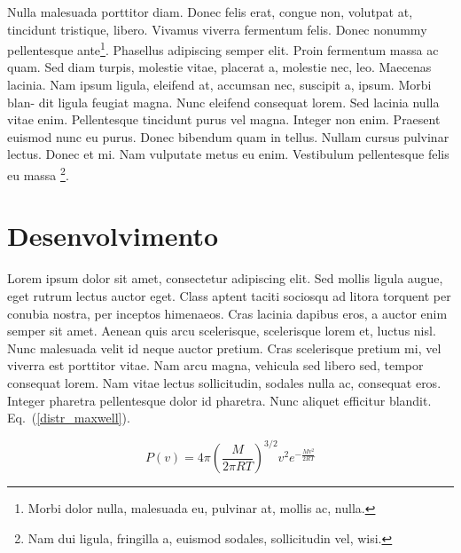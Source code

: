 \documentclass[%
a4paper, %
twocolumn, %
10pt %
]{article}
\begin{document}
Nulla malesuada porttitor diam. Donec felis erat, congue non, volutpat at, tincidunt tristique, libero. Vivamus viverra fermentum felis. Donec nonummy pellentesque ante\footnote{Morbi dolor nulla, malesuada eu, pulvinar at, mollis ac, nulla.}. Phasellus adipiscing semper elit. Proin fermentum massa ac quam. Sed diam turpis, molestie vitae, placerat a, molestie nec, leo. Maecenas lacinia. Nam ipsum ligula, eleifend at, accumsan nec, suscipit a, ipsum. Morbi blan- dit ligula feugiat magna. Nunc eleifend consequat lorem. Sed lacinia nulla vitae enim. Pellentesque tincidunt purus vel magna. Integer non enim. Praesent euismod nunc eu purus. Donec bibendum quam in tellus. Nullam cursus pulvinar lectus. Donec et mi. Nam vulputate metus eu enim. Vestibulum pellentesque felis eu massa \footnote{Nam dui ligula, fringilla a, euismod sodales, sollicitudin vel, wisi.}.


\section{Desenvolvimento}

Lorem ipsum dolor sit amet, consectetur adipiscing elit. Sed mollis ligula augue, eget rutrum lectus auctor eget. Class aptent taciti sociosqu ad litora torquent per conubia nostra, per inceptos himenaeos. Cras lacinia dapibus eros, a auctor enim semper sit amet. Aenean quis arcu scelerisque, scelerisque lorem et, luctus nisl. Nunc malesuada velit id neque auctor pretium. Cras scelerisque pretium mi, vel viverra est porttitor vitae. Nam arcu magna, vehicula sed libero sed, tempor consequat lorem. Nam vitae lectus sollicitudin, sodales nulla ac, consequat eros. Integer pharetra pellentesque dolor id pharetra. Nunc aliquet efficitur blandit. Eq.~(\ref{distr_maxwell}).

\begin{equation}
P(v) = 4\pi \left(\frac{M}{2\pi R T}\right)^{3/2} v^2 e^{-\frac{M v^2}{2RT}}
\label{distr_maxwell}
\end{equation}
\end{document}
